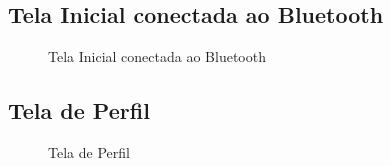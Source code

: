 \subsection{Tela Inicial conectada ao Bluetooth}
\begin{figure}[H]
\centering
{}
\caption{Tela Inicial conectada ao Bluetooth}
\end{figure}

\subsection{Tela de Perfil}
\begin{figure}[H]
\centering
{}
\caption{Tela de Perfil}
\end{figure}

